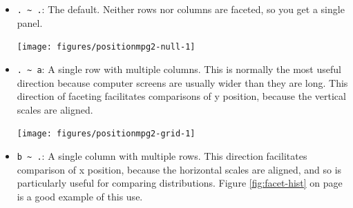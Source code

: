 \begin{itemize}
\item
  \texttt{. \textasciitilde{} .}: The default. Neither rows nor columns
  are faceted, so you get a single panel.

\begin{Shaded}
\begin{Highlighting}[]
\NormalTok{>}\StringTok{ } \StringTok{ }\NormalTok{()}
\end{Highlighting}
\end{Shaded}

  \begin{flushleft}\texttt{[image: figures/positionmpg2-null-1]} \end{flushleft}
\item
  \texttt{. \textasciitilde{} a}: A single row with multiple columns.
  This is normally the most useful direction because computer screens
  are usually wider than they are long. This direction of faceting
  facilitates comparisons of y position, because the vertical scales are
  aligned.

\begin{Shaded}
\begin{Highlighting}[]
\NormalTok{>}\StringTok{ } \StringTok{ }\StringTok{ }
\end{Highlighting}
\end{Shaded}

  \begin{flushleft}\texttt{[image: figures/positionmpg2-grid-1]} \end{flushleft}
\item
  \texttt{b \textasciitilde{} .}: A single column with multiple rows.
  This direction facilitates comparison of x position, because the
  horizontal scales are aligned, and so is particularly useful for
  comparing distributions. Figure \ref{fig:facet-hist} on page
  \pageref{fig:facet-hist} is a good example of this use.
\end{itemize}

\begin{Shaded}
\begin{Highlighting}[]
\NormalTok{>}\StringTok{ } \NormalTok{, } \NormalTok{) +}
\NormalTok{+}\StringTok{   }\StringTok{ }
\end{Highlighting}
\end{Shaded}

